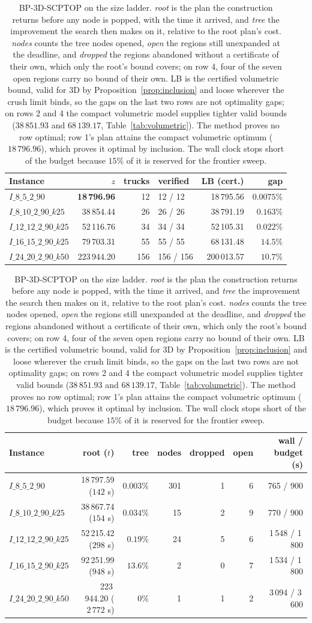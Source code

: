 \begin{table}[!htbp]
\centering
\small
\caption{BP-3D-SCPTOP on the size ladder. \emph{root} is the plan the
construction returns before any node is popped, with the time it
arrived, and \emph{tree} the improvement the search then makes on it,
relative to the root plan's cost. \emph{nodes} counts the tree nodes
opened, \emph{open} the regions still unexpanded at the deadline, and
\emph{dropped} the regions abandoned without a certificate of their
own, which only the root's bound covers; on row 4, four of the seven
open regions carry no bound of their own. LB is the certified volumetric bound,
valid for 3D by Proposition~\ref{prop:inclusion} and loose wherever the
crush limit binds, so the gaps on the last two rows are not optimality
gaps; on rows 2 and 4 the compact volumetric model supplies tighter
valid bounds ($38\,851.93$ and $68\,139.17$,
Table~\ref{tab:volumetric}). The method proves no row optimal; row 1's
plan attains the compact volumetric optimum ($18\,796.96$), which proves
it optimal by inclusion. The wall clock stops short of the budget because
$15\%$ of it is reserved for the frontier sweep.}
\label{tab:3d-onecommit}
\begin{tabular}{lrrlrr}
\toprule
Instance & $z$ & trucks & verified & LB (cert.) & gap \\
\midrule
$I\_8\_5\_2\_90$        & \textbf{18\,796.96} & 12  & 12 / 12   & 18\,795.56 & $0.0075\%$ \\
$I\_8\_10\_2\_90\_k25$  & 38\,854.44 & 26  & 26 / 26   & 38\,791.19 & $0.163\%$ \\
$I\_12\_12\_2\_90\_k25$ & 52\,116.76 & 34  & 34 / 34   & 52\,105.31 & $0.022\%$ \\
$I\_16\_15\_2\_90\_k25$ & 79\,703.31 & 55  & 55 / 55   & 68\,131.48 & $14.5\%$ \\
$I\_24\_20\_2\_90\_k50$ & 223\,944.20 & 156 & 156 / 156 & 200\,013.57 & $10.7\%$ \\
\bottomrule
\end{tabular}

\vspace{6pt}

\begin{tabular}{lrrrrrr}
\toprule
Instance & root ($t$) & tree & nodes & dropped & open & wall / budget (s) \\
\midrule
$I\_8\_5\_2\_90$        & 18\,797.59 ($142$ s) & $0.003\%$ & 301 & 1 & 6 & 765 / 900 \\
$I\_8\_10\_2\_90\_k25$  & 38\,867.74 ($154$ s) & $0.034\%$ & 15 & 2 & 9 & 770 / 900 \\
$I\_12\_12\_2\_90\_k25$ & 52\,215.42 ($298$ s) & $0.19\%$ & 24 & 5 & 6 & 1\,548 / 1\,800 \\
$I\_16\_15\_2\_90\_k25$ & 92\,251.99 ($948$ s) & $\mathbf{13.6\%}$ & 2 & 0 & 7 & 1\,534 / 1\,800 \\
$I\_24\_20\_2\_90\_k50$ & 223\,944.20 ($2\,772$ s) & $0\%$ & 1 & 1 & 2 & 3\,094 / 3\,600 \\
\bottomrule
\end{tabular}
\end{table}
